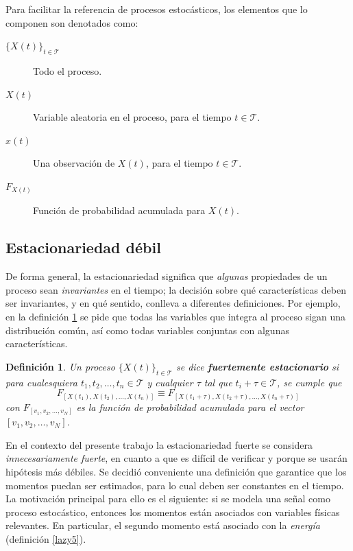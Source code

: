 \documentclass[12pt,letterpaper]{book}
\newtheorem{definicion}{Definición}[chapter]
\newcommand{\xt}{$\{X(t)\}_{t\in \mathcal{T}}$ }
\begin{document}
Para facilitar la referencia de procesos estocásticos, los elementos que lo componen son denotados como:
\begin{description}
\item[\xt]        Todo el proceso.
\item[$X(t)$]     Variable aleatoria en el proceso, para el tiempo $t \in \mathcal{T}$.
\item[$x(t)$]     Una observación de $X(t)$, para el tiempo $t \in \mathcal{T}$.
\item[$F_{X(t)}$] Función de probabilidad acumulada para $X(t)$.
\end{description}


\subsection{Estacionariedad débil}

De forma general, la estacionariedad significa que \textit{algunas} propiedades de un proceso sean \textit{invariantes} en el tiempo; la decisión sobre qué características deben ser invariantes, y en qué sentido, conlleva a diferentes definiciones.
%
Por ejemplo, en la definición \ref{est_fuerte} se pide que todas las variables que integra al proceso sigan una distribución común, así como todas variables conjuntas con algunas características.

\begin{definicion}%
Un proceso \xt se dice \textbf{fuertemente estacionario} si para cualesquiera $t_1, t_2, \dots, t_n \in \mathcal{T}$ y cualquier $\tau$ tal que $t_i + \tau \in \mathcal{T}$, se cumple que
\begin{equation*}
F_{\left[ X(t_1), X(t_2), \dots, X(t_n) \right]} \equiv
F_{\left[ X(t_1 + \tau), X(t_2 + \tau), \dots, X(t_n + \tau) \right]}
\end{equation*}
con $F_{[v_1,v_2,\dots,v_N]}$ es la función de probabilidad acumulada para el vector $[v_1,v_2,\dots,v_N]$.
\label{est_fuerte}
\end{definicion}

En el contexto del presente trabajo la estacionariedad fuerte se considera \textit{innecesariamente fuerte}, en cuanto a que es difícil de verificar y porque se usarán hipótesis más débiles.
%
Se decidió conveniente una definición que garantice que los momentos puedan ser estimados, para lo cual deben ser constantes en el tiempo.
%
La motivación principal para ello es el siguiente: si se modela una señal como proceso estocástico, entonces los momentos están asociados con variables físicas relevantes. 
%
En particular, el segundo momento está asociado con la \textit{energía} (definición \ref{lazy5}).
\end{document}
